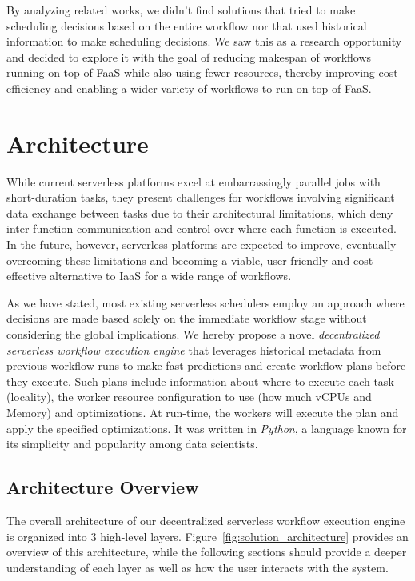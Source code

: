 \documentclass[conference]{IEEEtran}
\begin{document}
By analyzing related works, we didn't find solutions that tried to make scheduling decisions based on the entire workflow nor that used historical information to make scheduling decisions. We saw this as a research opportunity and decided to explore it with the goal of reducing makespan of workflows running on top of FaaS while also using fewer resources, thereby improving cost efficiency and enabling a wider variety of workflows to run on top of FaaS.


\section{Architecture}
\label{s:architecture}

While current serverless platforms excel at embarrassingly parallel jobs with short-duration tasks, they present challenges for workflows involving significant data exchange between tasks due to their architectural limitations, which deny inter-function communication and control over where each function is executed. In the future, however, serverless platforms are expected to improve, eventually overcoming these limitations and becoming a viable, user-friendly and cost-effective alternative to IaaS for a wide range of workflows.

As we have stated, most existing serverless schedulers employ an approach where decisions are made based solely on the immediate workflow stage without considering the global implications. We hereby propose a novel \textit{decentralized serverless workflow execution engine} that leverages historical metadata from previous workflow runs to make fast predictions and create workflow plans before they execute. Such plans include information about where to execute each task (locality), the worker resource configuration to use (how much vCPUs and Memory) and optimizations. At run-time, the workers will execute the plan and apply the specified optimizations. It was written in \textit{Python}, a language known for its simplicity and popularity among data scientists.

\subsection{Architecture Overview}

The overall architecture of our decentralized serverless workflow execution engine is organized into 3 high-level layers. Figure~\ref{fig:solution_architecture} provides an overview of this architecture, while the following sections should provide a deeper understanding of each layer as well as how the user interacts with the system.
\end{document}
